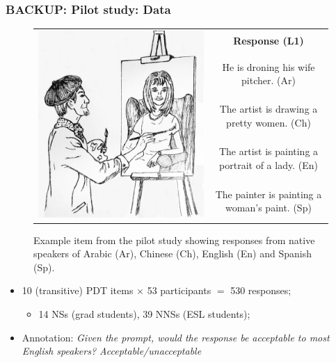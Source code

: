 \documentclass[handout,xcolor={dvipsnames}]{beamer}
\begin{document}
\begin{frame}
\frametitle{BACKUP: Pilot study: Data}
\begin{small}
\begin{figure}[htb!]
\begin{center}
\bgroup
\def\arraystretch{1.45}
\begin{tabular}{|c|c|}
\hline
\multirow{5}{*}{\includegraphics[trim=0 50 0 20,clip,width=0.28\columnwidth]{figures/exampleprompt.jpg}} &
\textbf{Response (L1)} \\
\cline{2-2}
& He is droning his wife pitcher. (Ar) \\
\cline{2-2}
& The artist is drawing a pretty women. (Ch) \\
\cline{2-2}
& The artist is painting a portrait of a lady. (En) \\
\cline{2-2}
& The painter is painting a woman's paint. (Sp) \\
\hline
\end{tabular}
\egroup
\end{center}
\caption{Example item from the pilot study showing responses from native speakers of Arabic (Ar), Chinese (Ch), English (En) and Spanish (Sp).}
\label{fig:example-picture}
\end{figure}
\end{small}
\vspace{-1em}
\pause
\begin{itemize}
\item 10 (transitive) PDT items $\times$ 53 participants $=$ 530 responses;
\pause
\begin{itemize}
\item 14 NSs (grad students), 39 NNSs (ESL students);
\end{itemize}
\pause
\item Annotation: \textit{Given the prompt, would the response be acceptable to most English speakers? Acceptable/unacceptable}
\begin{itemize}

\end{itemize}
\end{itemize}
\end{frame}
\end{document}
